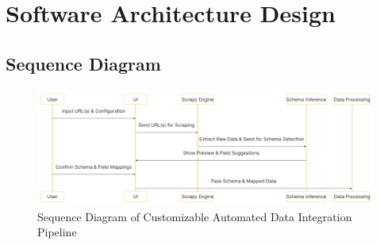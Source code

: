 \chapter{Software Architecture Design}





\section{Sequence Diagram}

\begin{figure}[htbp]
    \centering
    \includegraphics[width=\textwidth]{assets/sequence-diagram-pipeline.png}
    \caption{Sequence Diagram of Customizable Automated Data Integration Pipeline}
    \label{fig:sequence-diagram-data-pipeline}
\end{figure}

